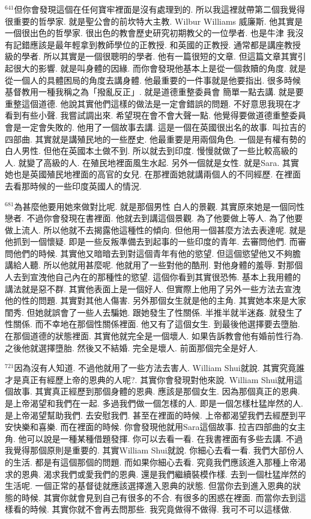 \documentclass{book}
\begin{document}
$^{641}$但你會發現這個在任何寶牢裡面是沒有處理到的.
所以我這裡就帶第二個我覺得很重要的哲學家.
就是聖公會的前坎特大主教.
Wilbur Williams 威廉斯.
他其實是一個很出色的哲學家.
很出色的教會歷史研究初期教父的一位學者.
也是牛津 我沒有記錯應該是最年輕拿到教師學位的正教授.
和英國的正教授.
通常都是講座教授級的學者.
所以其實是一個很聰明的學者.
他有一篇很短的文章.
但這篇文章其實引起很大的影響.
就是叫身體的因緣.
而你會發現他基本上是從一個救贖的角度.
就是從一個人的具體困局的角度去講身體.
他最重要的一件事就是他要指出.
很多時候基督教用一種我稱之為「撥亂反正」.
就是道德重整委員會 簡單一點去講.
就是要重整這個道德.
他說其實他們這樣的做法是一定會錯誤的問題.
不好意思我現在才看到有些小聲.
我嘗試調出來.
希望現在會不會大聲一點.
他覺得要做道德重整委員會是一定會失敗的.
他用了一個故事去講.
這是一個在英國很出名的故事.
叫拉吉的四部曲.
其實就是講殖民地的一些歷史.
他最重要是用兩個角色.
一個是有權有勢的白人男性.
但他在英國本土做不到.
所以就去到印度.
慢慢就做了一些比較高級的人.
就變了高級的人.
在殖民地裡面風生水起.
另外一個就是女性.
就是Sara.
其實她也是英國殖民地裡面的高官的女兒.
在那裡面她就講兩個人的不同經歷.
在裡面去看那時候的一些印度英國人的情況.

$^{681}$為甚麼他要用她來做對比呢.
就是那個男性 白人的景觀.
其實原來她是一個同性戀者.
不過你會發現在書裡面.
他就去到講這個景觀.
為了他要做上等人.
為了他要做上流人.
所以他就不去揭露他這種性的傾向.
但他用一個甚麼方法去表達呢.
就是他抓到一個懷疑.
即是一些反叛準備去到起事的一些印度的青年.
去審問他們.
而審問他們的時候.
其實他又暗暗去到對這個青年有他的慾望.
但這個慾望他又不夠膽講給人聽.
所以他就用甚麼呢.
他就用了一些對他的酷刑.
對他身體的羞辱.
對那個人去到宣洩他自己內在的那種性的慾望.
這個你看到其實很恐怖.
基本上我用體的講法就是惡不群.
其實他表面上是一個好人.
但實際上他用了另外一些方法去宣洩他的性的問題.
其實對其他人傷害.
另外那個女生就是他的主角.
其實她本來是大家閨秀.
但她就誤會了一些人去騙她.
跟她發生了性關係.
半推半就半迷姦.
就發生了性關係.
而不幸地在那個性關係裡面.
他又有了這個女生.
到最後他選擇要去墮胎.
在那個道德的狀態裡面.
其實他就完全是一個壞人.
如果告訴教會他有婚前性行為.
之後他就選擇墮胎.
然後又不結婚.
完全是壞人.
前面那個完全是好人.

$^{721}$因為沒有人知道.
不過他就用了一些方法去害人.
William Shui就說.
其實究竟誰才是真正有經歷上帝的恩典的人呢?.
其實你會發現對他來說.
William Shui就用這個故事.
其實真正經歷到那個身體的恩典.
應該是那個女生.
因為那個真正的恩典.
是上帝渴望和我們在一起.
多過我們做一個怎樣的人.
即是一個怎樣杜猛岸然的人.
是上帝渴望幫助我們.
去安慰我們.
甚至在裡面的時候.
上帝都渴望我們去經歷到平安快樂和喜樂.
而在裡面的時候.
你會發現他就用Sara這個故事.
拉吉四部曲的女主角.
他可以說是一種某種借題發揮.
你可以去看一看.
在我書裡面有多些去講.
不過我覺得那個原則是重要的.
其實William Shui就說.
你細心去看一看.
我們大部份人的生活.
都是有這個那個的問題.
而如果你細心去看.
究竟我們應該進入那種上帝渴求的恩典.
渴求我們或愛我們的恩典.
還是我們繼續裝模作樣.
去到一個杜猛岸然的生活呢.
一個正常的基督徒就應該選擇進入恩典的狀態.
但當你去到進入恩典的狀態的時候.
其實你就會見到自己有很多的不合.
有很多的困惑在裡面.
而當你去到這樣看的時候.
其實你就不會再去問那些.
我究竟做得不做得.
我可不可以這樣做.
\end{document}

